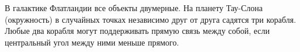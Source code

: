 \documentclass[12pt, addpoints, answers]{exam} %
\begin{document}
\begin{questions}


\begin{comment}
\question Внутри треугольника с вершинами $(0,0)$, $(2,5)$ и $(8,0)$ случайно равномерно по площади выбирается точка. Пусть $X$ и $Y$ --- абсцисса и ордината этой случаной точки.
\begin{parts}
\part Вероятность того, что $X>5$ равна \fillin[...].
\part Вероятность того, что $X>5$ и одновременно $Y<3$ равна \fillin[..].
\part Вероятность того, что $X>5$ если известно, что $Y<3$ равна \fillin[...].
\part События $X>5$ и $Y<3$ являются \fillin[...]висимыми.
\part Функция плотности величины $X$ равна 
\begin{flalign*}
f(x) &= &&
\end{flalign*}

\end{parts}
\end{comment}

\question В галактике Флатландии все объекты двумерные. На планету Тау-Слона (окружность) в случайных точках независимо друг от друга садятся три корабля. Любые два корабля могут поддерживать прямую связь между собой, если центральный угол между ними меньше прямого. 

\end{questions}
\end{document}
